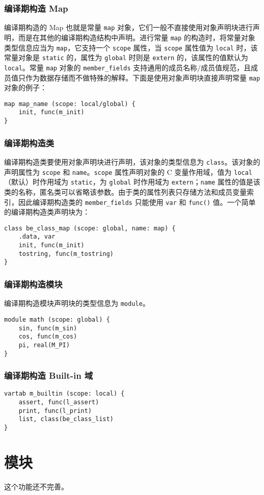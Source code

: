 \subsubsection{编译期构造 Map}

编译期构造的 Map 也就是常量 \texttt{map} 对象，它们一般不直接使用对象声明块进行声明，而是在其他的编译期构造结构中声明。进行常量 \texttt{map} 的构造时，将常量对象类型信息应当为 \texttt{map}，它支持一个 \texttt{scope} 属性，当 \texttt{scope} 属性值为 \texttt{local} 时，该常量对象是 \texttt{static} 的，属性为 \texttt{global} 时则是 \texttt{extern} 的，该属性的值默认为 \texttt{local}。常量 \texttt{map} 对象的 \texttt{member\_fields} 支持通用的成员名称/成员值规范，且成员值只作为数据存储而不做特殊的解释。下面是使用对象声明块直接声明常量 \texttt{map} 对象的例子：
\begin{lstlisting}
map map_name (scope: local/global) {
    init, func(m_init)
}
\end{lstlisting}

\subsubsection{编译期构造类}

编译期构造类要使用对象声明块进行声明，该对象的类型信息为 \texttt{class}。该对象的声明属性为 \texttt{scope} 和 \texttt{name}。\texttt{scope} 属性声明对象的 C 变量作用域，值为 \texttt{local}（默认）时作用域为 \texttt{static}，为 \texttt{global} 时作用域为 \texttt{extern}；\texttt{name} 属性的值是该类的名称，匿名类可以省略该参数。由于类的属性列表只存储方法和成员变量索引，因此编译期构造类的 \texttt{member\_fields} 只能使用 \texttt{var} 和 \texttt{func()} 值。一个简单的编译期构造类声明块为：
\begin{lstlisting}
class be_class_map (scope: global, name: map) {
    .data, var
    init, func(m_init)
    tostring, func(m_tostring)
}
\end{lstlisting}

\subsubsection{编译期构造模块}

编译期构造模块声明块的类型信息为 \texttt{module}。

\begin{lstlisting}
module math (scope: global) {
    sin, func(m_sin)
    cos, func(m_cos)
    pi, real(M_PI)
}
\end{lstlisting}

\subsubsection{编译期构造 Built-in 域}

\begin{lstlisting}
vartab m_builtin (scope: local) {
    assert, func(l_assert)
    print, func(l_print)
    list, class(be_class_list)
}
\end{lstlisting}

\section{模块}

这个功能还不完善。
